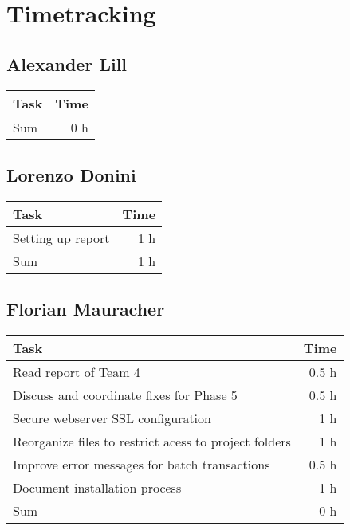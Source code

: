 \chapter{Timetracking}\label{chapter:timetracking}
\section*{Alexander Lill}
\begin{table}[h!tpb]
  \centering
  \begin{tabularx}{\textwidth}{X r}
    \toprule
      Task & Time \\
    \midrule
    \midrule
      Sum & 0 h \\
    \bottomrule
  \end{tabularx}
\end{table}

\clearpage
\section*{Lorenzo Donini}
\begin{table}[h!tpb]
  \centering
  \begin{tabularx}{\textwidth}{X r}
    \toprule
      Task & Time \\
    \midrule
      Setting up report & 1 h \\
    \midrule
      Sum & 1 h \\
    \bottomrule
  \end{tabularx}
\end{table}

\clearpage
\section*{Florian Mauracher}
\begin{table}[h!tpb]
  \centering
  \begin{tabularx}{\textwidth}{X r}
    \toprule
      Task & Time \\
    \midrule
      Read report of Team 4 & 0.5 h \\
      Discuss and coordinate fixes for Phase 5  & 0.5 h \\
      Secure webserver SSL configuration & 1 h \\
      Reorganize files to restrict acess to project folders & 1 h \\
      Improve error messages for batch transactions & 0.5 h \\
      Document installation process & 1 h \\
    \midrule
      Sum & 0 h \\
    \bottomrule
  \end{tabularx}
\end{table}

